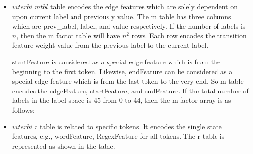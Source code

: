   \begin{itemize}
  \item 
  $viterbi\_mtbl$ table
  encodes the edge features which are solely dependent on upon current label and
  previous y value. The m table has three columns which are prev\_label, label,
  and value respectively.
  If the number of labels is $n$, then the m factor table will have $n^2$
  rows. Each row encodes the transition feature weight value from the previous label
  to the current label.
 
  startFeature is considered as a special edge feature which is from the
  beginning to the first token. Likewise, endFeature can be considered
  as a special edge feature which is from the last token to the very end.
  So m table encodes the edgeFeature, startFeature, and endFeature.
  If the total number of labels in the label space is 45 from 0 to 44,
  then the m factor array is as follows:
  \item 
  $viterbi\_r$ table
  is related to specific tokens. It encodes the single state features,
  e.g., wordFeature, RegexFeature for all tokens. The r table is represented as
  shown in the table.\\


\end{itemize}
